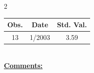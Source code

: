 
\bigskip 
\begin{multicols}{2}{ 
\begin{tabular}{ccc}
\hline  Obs.  &  Date &  Std. Val. \\ 
\hline 
                       13 &        1/2003 &          3.59 \vspace{-.12in} \\  
 \end{tabular} 
\\ 
 \columnbreak 
 \singlespacing 
 \underline{\textbf{Comments:}} \\ 
 \bigskip       

 } 
\end{multicols} 
